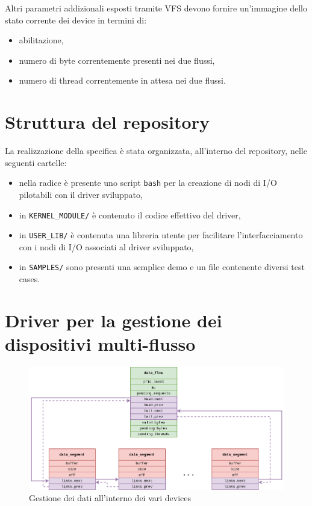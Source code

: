 \documentclass{article}
\begin{document}
Altri parametri addizionali esposti tramite VFS devono fornire un'immagine dello stato corrente dei device in termini di:
\begin{itemize}
        \item abilitazione,
        \item numero di byte correntemente presenti nei due flussi,
        \item numero di thread correntemente in attesa nei due flussi.
\end{itemize}

\section{Struttura del repository}
La realizzazione della specifica è stata organizzata, all'interno del repository, nelle seguenti cartelle:
\begin{itemize}
        \item nella radice è presente uno script \texttt{bash} per la creazione di nodi di I/O pilotabili con il driver sviluppato,
        \item in \texttt{KERNEL\_MODULE/} è contenuto il codice effettivo del driver,
        \item in \texttt{USER\_LIB/} è contenuta una libreria utente per facilitare l'interfacciamento con i nodi di I/O associati al driver sviluppato,
        \item in \texttt{SAMPLES/} sono presenti una semplice demo e un file contenente diversi test cases.
\end{itemize}

\section{Driver per la gestione dei dispositivi multi-flusso}
\begin{figure}[htbp]
        \centering
        \includegraphics[width=.8\textwidth]{data}
        \caption{Gestione dei dati all'interno dei vari devices}
        \label{fig:data}
\end{figure}
\end{document}
